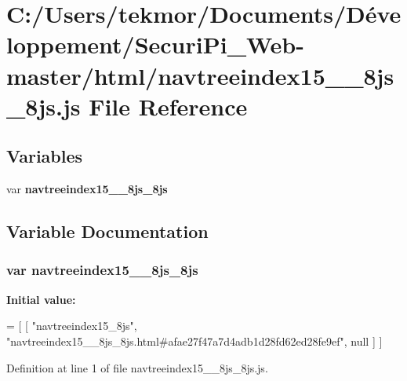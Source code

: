 \section{C\+:/\+Users/tekmor/\+Documents/\+Développement/\+Securi\+Pi\+\_\+\+Web-\/master/html/navtreeindex15\+\_\+\+\_\+8js\+\_\+8js.js File Reference}
\label{navtreeindex15____8js__8js_8js}
\subsection*{Variables}
\begin{DoxyCompactItemize}
\item 
var {\bf navtreeindex15\+\_\+\+\_\+8js\+\_\+8js}
\end{DoxyCompactItemize}


\subsection{Variable Documentation}
\subsubsection[{navtreeindex15\+\_\+\+\_\+8js\+\_\+8js}]{\setlength{\rightskip}{0pt plus 5cm}var navtreeindex15\+\_\+\+\_\+8js\+\_\+8js}\label{navtreeindex15____8js__8js_8js_a454f5d9a28576ab27280f82c4bd60c27}
{\bfseries Initial value\+:}
\begin{DoxyCode}
=
[
    [ \textcolor{stringliteral}{"navtreeindex15\_8js"}, \textcolor{stringliteral}{"navtreeindex15\_\_8js\_8js.html#afae27f47a7d4adb1d28fd62ed28fe9ef"}, null ]
]
\end{DoxyCode}


Definition at line 1 of file navtreeindex15\+\_\+\+\_\+8js\+\_\+8js.\+js.

